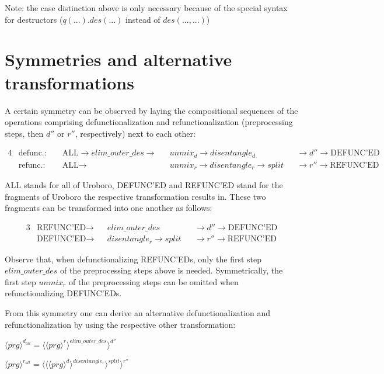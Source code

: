 \documentclass[11pt]{article} %
\begin{document}
Note: the case distinction above is only necessary because of the special syntax for destructors ($q(...).des(...)$ instead of $des(..., ...)$)

\section{Symmetries and alternative transformations}

A certain symmetry can be observed by laying the compositional sequences of the operations comprising defunctionalization and refunctionalization (preprocessing steps, then $d''$ or $r''$, respectively) next to each other:

\begin{alignat*}{4}
&\textrm{defunc.: } &&\textrm{ALL} \rightarrow  elim\_outer\_des \rightarrow && unmix_d \rightarrow disentangle_d && \rightarrow d'' \rightarrow \textrm{DEFUNC'ED} \\
&\textrm{refunc.: } &&\textrm{ALL} \rightarrow && unmix_r \rightarrow disentangle_r \rightarrow split && \rightarrow r'' \rightarrow \textrm{REFUNC'ED}
\end{alignat*}

ALL stands for all of Uroboro, DEFUNC'ED and REFUNC'ED stand for the fragments of Uroboro the respective transformation results in. These two fragments can be transformed into one another as follows:

\begin{alignat*}{3}
&\textrm{REFUNC'ED} \rightarrow && elim\_outer\_des &&\rightarrow d'' \rightarrow \textrm{DEFUNC'ED} \\
&\textrm{DEFUNC'ED} \rightarrow && disentangle_r \rightarrow split && \rightarrow r'' \rightarrow \textrm{REFUNC'ED}
\end{alignat*}

Observe that, when defunctionalizing REFUNC'EDs, only the first step $elim\_outer\_des$ of the preprocessing steps above is needed. Symmetrically, the first step $unmix_r$ of the preprocessing steps can be omitted when refunctionalizing DEFUNC'EDs.

From this symmetry one can derive an alternative defunctionalization and refunctionalization by using the respective other transformation:

$\langle prg \rangle^{d_{alt}} = \langle \langle prg \rangle^r \rangle^{elim\_outer\_des} \rangle^{d''}$

$\langle prg \rangle^{r_{alt}} = \langle \langle \langle prg \rangle^d \rangle^{disentangle_r} \rangle^{split} \rangle^{r''}$
\end{document}
